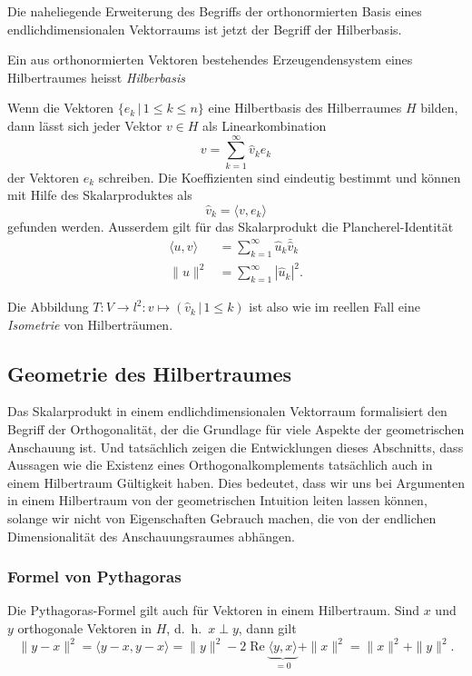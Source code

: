 Die naheliegende Erweiterung des Begriffs der orthonormierten Basis
eines endlichdimensionalen Vektorraums ist jetzt der Begriff der
Hilberbasis.

\begin{definition}
Ein aus orthonormierten Vektoren bestehendes Erzeugendensystem
eines Hilbertraumes heisst {\em Hilberbasis}
\end{definition}

\begin{satz}
Wenn die Vektoren $\{e_k\,|\, 1\le k\le n\}$ eine Hilbertbasis des
Hilberraumes $H$ bilden,
dann lässt sich jeder Vektor $v\in H$ als Linearkombination
\[
v
=
\sum_{k=1}^\infty \hat{v}_k e_k
\]
der Vektoren $e_k$ schreiben.
Die Koeffizienten sind eindeutig bestimmt und können mit Hilfe des
Skalarproduktes als
\[
\hat{v}_k = \langle v,e_k\rangle
\]
gefunden werden.
Ausserdem gilt für das Skalarprodukt die Plancherel-Identität
\begin{align*}
\langle u,v\rangle &= \sum_{k=1}^\infty \hat{u}_k\bar{\hat{v}}_k
\\
\| u \|^2 &= \sum_{k=1}^\infty |\hat{u}_k|^2.
\end{align*}
\end{satz}

Die Abbildung $T\colon V\to l^2: v\mapsto (\hat{v}_k\,|\,1\le k)$
ist also wie im reellen Fall eine {\em Isometrie} von Hilberträumen.

\subsection{Geometrie des Hilbertraumes
\label{subsection:geometrie-hilbertraum}}
Das Skalarprodukt in einem endlichdimensionalen Vektorraum formalisiert
den Begriff der Orthogonalität, der die Grundlage für viele Aspekte
der geometrischen Anschauung ist.
Und tatsächlich zeigen die Entwicklungen dieses Abschnitts, dass Aussagen
wie die Existenz eines Orthogonalkomplements tatsächlich auch in einem
Hilbertraum Gültigkeit haben.
Dies bedeutet, dass wir uns bei Argumenten in einem Hilbertraum von 
der geometrischen Intuition leiten lassen können, solange wir nicht
von Eigenschaften Gebrauch machen, die von der endlichen Dimensionalität
des Anschauungsraumes abhängen.

\subsubsection{Formel von Pythagoras}
Die Pythagoras-Formel gilt auch für Vektoren in einem Hilbertraum.
Sind $x$ und $y$ orthogonale Vektoren in $H$, d.~h.~$x\perp y$, dann
gilt
\begin{equation}
\|y-x\|^2
=
\langle y-x,y-x\rangle
=
\|y\|^2
-
2\operatorname{Re}\underbrace{\langle y,x\rangle}_{\displaystyle=0}
+
\|x\|^2
=
\|x\|^2 + \|y\|^2.
\label{formel:pythagoras}
\end{equation}

